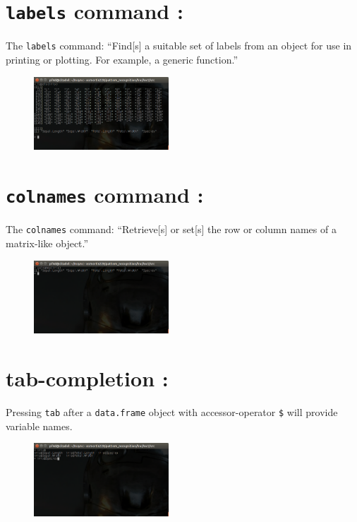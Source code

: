 \begin{multicols*}{2}
\section{\texttt{labels} command :}

The \texttt{labels} command: ``Find[s] a suitable set of labels from an object for use in printing or plotting.  For example, a generic function.''

\begin{figure}[H]
  \centering
    \includegraphics[width=0.45\textwidth]{images/labels_command.png}
\end{figure}

\section{\texttt{colnames} command :}

The \texttt{colnames} command: ``Retrieve[s] or set[s] the row or column names of a matrix-like object.''

\begin{figure}[H]
  \centering
    \includegraphics[width=0.45\textwidth]{images/colnames_command.png}
\end{figure}

\section{tab-completion :}

Pressing \texttt{tab} after a \texttt{data.frame} object with accessor-operator \texttt{\$} will provide variable names.

\begin{figure}[H]
  \centering
    \includegraphics[width=0.45\textwidth]{images/tab_completion.png}
\end{figure}


\end{multicols*}
